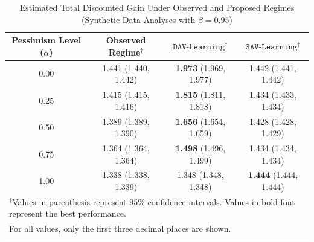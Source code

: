 \documentclass[opre,nonblindrev]{informs2}%
\newcommand{\1}{\hbox{\rm 1\kern-.35em 1}}
\newcommand{\SAV}{\texttt{SAV-Learning}}
\newcommand{\DAV}{\texttt{DAV-Learning}}
\begin{document}
{
	\renewcommand{\arraystretch}{1.2}
	\begin{table}[t]
		\caption{\baselineskip=10pt  Estimated Total Discounted Gain Under Observed and Proposed Regimes  (Synthetic Data Analyses with $\beta=0.95$)}\label{Table:Results2}

		\begin{center}
			\scriptsize
			\begin{tabular}{cccc}
				\hline
				{\bf Pessimism Level ($\alpha$)} & {\bf Observed Regime$^\dag$} & {\bf $\DAV$$^\dag$} & {\bf $\SAV$$^\dag$} \\ \hline
				0.00 &  1.441 (1.440, 1.442)  & {\bf 1.973} (1.969, 1.977)  & 1.442 (1.441, 1.442) \\
                0.25 &  1.415 (1.415, 1.416)  & {\bf 1.815} (1.811, 1.818)  & 1.434 (1.433, 1.434) \\
                0.50 &  1.389 (1.389, 1.390)  & {\bf 1.656} (1.654, 1.659)  & 1.428 (1.428, 1.429) \\
                0.75 &  1.364 (1.364, 1.364)  & {\bf 1.498} (1.496, 1.499)  & 1.434 (1.434, 1.434) \\
				1.00 &  1.338 (1.338, 1.339)  & 1.348 (1.348, 1.348)  & {\bf 1.444} (1.444, 1.444) \\
\hline
\multicolumn{4}{l}{$^\dag$\normalfont Values in parenthesis represent $95\%$ confidence intervals. Values in bold font represent the best performance.}\\
\multicolumn{4}{l}{\normalfont For all values, only the first three decimal places are shown.}
			\end{tabular}
		
		\end{center}
		\vspace{-10pt}
	\end{table}
}
\end{document}
